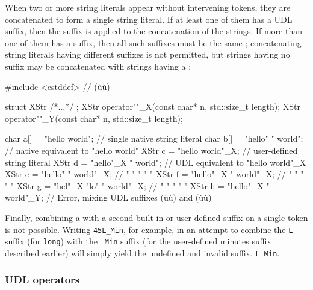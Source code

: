 When two or more string literals appear without intervening tokens, they
are concatenated to form a single string literal. If at least one of
them has a UDL suffix, then the suffix is applied to the concatenation
of the  strings. If more than one of them has a
suffix, then all such suffixes must be the same ;
concatenating string literals having different suffixes is not
permitted, but strings having no suffix may be concatenated with strings
having a :

\begin{emcppslisting}
#include <cstddef>  // (ù{}ù)

struct XStr { /*...*/ };
XStr operator""_X(const char* n, std::size_t length);
XStr operator""_Y(const char* n, std::size_t length);

char a[] = "hello world";            // single native string literal
char b[] = "hello"      " world";    // native equivalent to "hello world"
XStr c   = "hello world"_X;          // user-defined string literal
XStr d   = "hello"_X    " world";    // UDL equivalent to "hello world"_X
XStr e   = "hello"      " world"_X;  //  "      "      "     "     "
XStr f   = "hello"_X    " world"_X;  //  "      "      "     "     "
XStr g   = "hel"_X "lo" " world"_X;  //  "      "      "     "     "
XStr h   = "hello"_X    " world"_Y;  // Error, mixing UDL suffixes (ù{}ù) and (ù{}ù)
\end{emcppslisting}
    
\noindent Finally, combining a  with a
second built-in or user-defined suffix on a single token is not possible. Writing
\lstinline!45L_Min!, for example, in an attempt to combine the \lstinline!L!
suffix (for \lstinline!long!) with the \lstinline!_Min! suffix (for the
user-defined minutes suffix described earlier) will
simply yield the undefined and invalid suffix, \lstinline!L_Min!.

\subsubsection[UDL operators]{UDL operators}\label{user-defined-literal-(udl)-operators}

